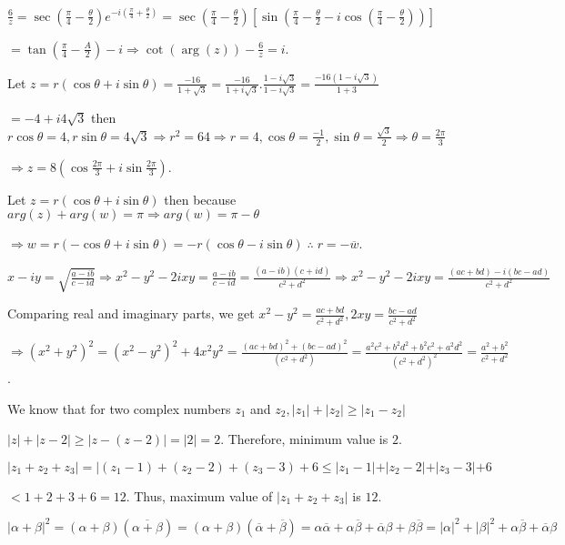   $\frac{6}{z} = \sec\left(\frac{\pi}{4} - \frac{\theta}{2}\right)e^{-i\left(\frac{\pi}{4} +
    \frac{\theta}{2}\right)} = \sec\left(\frac{\pi}{4} - \frac{\theta}{2}\right)
  \left[\sin\left(\frac{\pi}{4} - \frac{\theta}{2} - i\cos\left(\frac{\pi}{4} -
    \frac{\theta}{2}\right)\right)\right]$

  $= \tan\left(\frac{\pi}{4} - \frac{A}{2}\right) - i \Rightarrow \cot(\arg(z)) - \frac{6}{z} = i$.
\item Let $z = r(\cos\theta + i\sin\theta) = \frac{-16}{1 + \sqrt{3}} = \frac{-16}{1 + i\sqrt{3}}.\frac{1 -
  i\sqrt{3}}{1 - i\sqrt{3}} = \frac{-16(1 - i\sqrt{3})}{1 + 3}$

  $= -4 + i4\sqrt{3}$ then $r\cos\theta = 4, r\sin\theta = 4\sqrt{3} \Rightarrow r^2 = 64 \Rightarrow r = 4,
  \cos\theta = \frac{-1}{2}, \sin\theta = \frac{\sqrt{3}}{2} \Rightarrow \theta = \frac{2\pi}{3}$

  $\Rightarrow z = 8\left(\cos\frac{2\pi}{3} + i\sin\frac{2\pi}{3}\right)$.
\item Let $z = r(\cos\theta + i\sin\theta)$ then because $arg(z) + arg(w) = \pi \Rightarrow arg(w) = \pi -
  \theta$

  $\Rightarrow w = r(-\cos\theta + i\sin\theta) = -r(\cos\theta - i\sin\theta)\;\therefore\;r =
  -\overline{w}$.
\item $x - iy = \sqrt{\frac{a - ib}{c - id}} \Rightarrow x^2 - y^2 - 2ixy = \frac{a - ib}{c - id} = \frac{(a
  - ib)(c + id)}{c^2 + d^2}\Rightarrow x^2 - y^2 - 2ixy = \frac{(ac + bd) -i(bc - ad)}{c^2 + d^2}$

  Comparing real and imaginary parts, we get $x^2 - y^2 = \frac{ac + bd}{c^2 + d^2}, 2xy = \frac{bc -
    ad}{c^2 + d^2}$

  $\Rightarrow (x^2 + y^2)^2 = (x^2 - y^2)^2 + 4x^2y^2 = \frac{(ac + bd)^2 + (bc - ad)^2}{(c^2 + d^2)} = \frac{a^2c^2 +
    b^2d^2 + b^2c^2 + a^2d^2}{(c^2 + d^2)^2} = \frac{a^2 + b^2}{c^2 + d^2}$.
\item We know that for two complex numbers $z_1$ and $z_2, |z_1| + |z_2|\geq |z_1 - z_2|$

  $|z| + |z - 2| \geq |z - (z - 2)| = |2| = 2$.  Therefore, minimum value is $2$.
\item $|z_1 + z_2 + z_3| = |(z_1 - 1) + (z_2 - 2) + (z_3 - 3) + 6\leq |z_1 - 1| + |z_2 - 2| + |z_3 - 3| + 6$

  $< 1 + 2+ 3 + 6 = 12$.  Thus, maximum value of $|z_1 + z_2 + z_3|$ is $12.$
\item $|\alpha + \beta|^2 = (\alpha + \beta)(\overline{\alpha + \beta}) = (\alpha + \beta)(\overline{\alpha}
  + \overline{\beta}) = \alpha\overline{\alpha} + \alpha\overline{\beta} + \overline{\alpha}\beta +
  \beta\overline{\beta} = |\alpha|^2 + |\beta|^2 + \alpha\overline{\beta} + \overline{\alpha}\beta$

